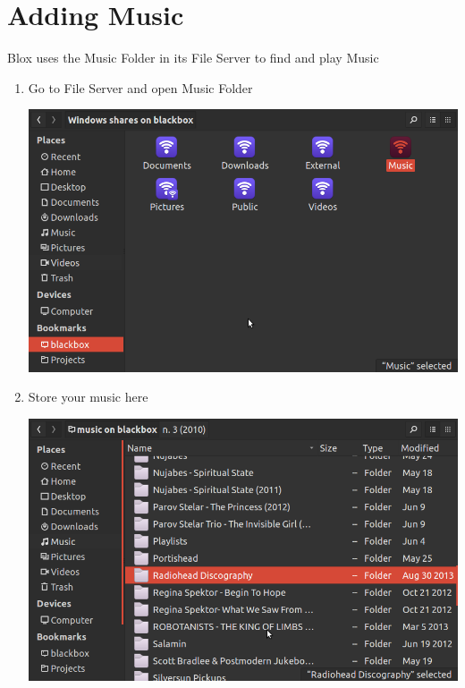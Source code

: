 \documentclass[letterpaper,10pt,english]{sphinxmanual}
\begin{document}
\section{Adding Music}
\label{music:id2}\label{music:adding-music}
Blox uses the Music Folder in its File Server to find and play Music
\begin{enumerate}
\item {} 
Go to File Server and open Music Folder

\includegraphics{file-music-selected.png}

\item {} 
Store your music here

\includegraphics{music-folder.png}

\end{enumerate}
\end{document}
